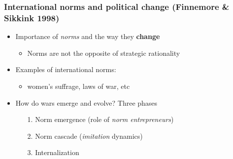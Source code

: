 \documentclass[aspectratio=43]{beamer}
\begin{document}
\begin{frame}
\frametitle{International norms and political change \scriptsize{(Finnemore \& Sikkink 1998)}}
\centering

\begin{itemize}
  \item Importance of \textit{norms} and the way they \textbf{change}
  \begin{itemize}
    \item Norms are not the opposite of strategic rationality
  \end{itemize}
  \item<2-> Examples of international norms:
  \begin{itemize}
    \item women's suffrage, laws of war, etc
  \end{itemize}
  \item<3-> How do wars emerge and evolve? Three phases
  \begin{itemize}
    \item[1.] Norm emergence (role of \textit{norm entrepreneurs})
    \item[2.] Norm cascade (\textit{imitation} dynamics)
    \item[3.] Internalization
  \end{itemize}
\end{itemize}

\end{frame}
\end{document}
